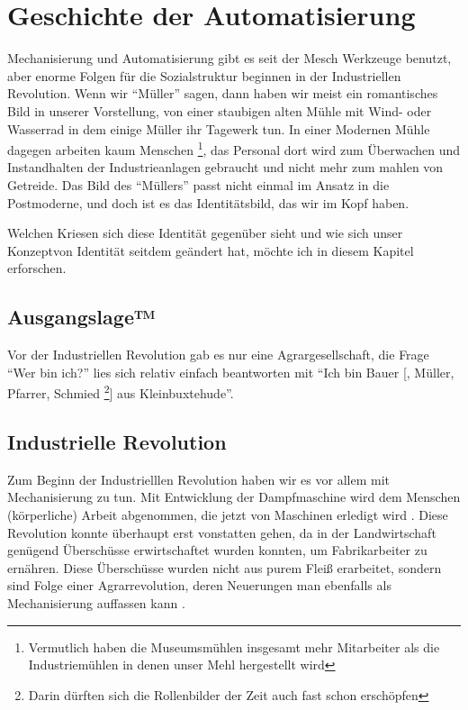\section{Geschichte der Automatisierung}

Mechanisierung und Automatisierung gibt es seit der Mesch Werkzeuge benutzt, aber enorme Folgen für die Sozialstruktur beginnen in der Industriellen Revolution.
Wenn wir \enquote{Müller} sagen, dann haben wir meist ein romantisches Bild in unserer Vorstellung, von einer staubigen alten Mühle mit Wind- oder Wasserrad in dem einige Müller ihr Tagewerk tun.
In einer Modernen Mühle dagegen arbeiten kaum Menschen \footnote{Vermutlich haben die Museumsmühlen insgesamt mehr Mitarbeiter als die Industriemühlen in denen unser Mehl hergestellt wird}, das Personal dort wird zum Überwachen und Instandhalten der Industrieanlagen gebraucht und nicht mehr zum mahlen von Getreide.
Das Bild des \enquote{Müllers} passt nicht einmal im Ansatz in die Postmoderne, und doch ist es das Identitätsbild, das wir im Kopf haben.

Welchen Kriesen sich diese Identität gegenüber sieht und wie sich unser Konzeptvon Identität seitdem geändert hat, möchte ich in diesem Kapitel erforschen.


\subsection{Ausgangslage™}

Vor der Industriellen Revolution gab es nur eine Agrargesellschaft, die Frage \enquote{Wer bin ich?} lies sich relativ einfach beantworten mit \enquote{Ich bin Bauer [, Müller, Pfarrer, Schmied \footnote{Darin dürften sich die Rollenbilder der Zeit auch fast schon erschöpfen}] aus Kleinbuxtehude}.


\subsection{Industrielle Revolution}

Zum Beginn der Industrielllen Revolution haben wir es vor allem mit Mechanisierung zu tun.
Mit Entwicklung der Dampfmaschine wird dem Menschen (körperliche) Arbeit abgenommen, die jetzt von Maschinen erledigt wird \parencite{landes}.
Diese Revolution konnte überhaupt erst vonstatten gehen, da in der Landwirtschaft genügend Überschüsse erwirtschaftet wurden konnten, um Fabrikarbeiter zu ernähren. Diese Überschüsse wurden nicht aus purem Fleiß erarbeitet, sondern sind Folge einer Agrarrevolution, deren Neuerungen man ebenfalls als Mechanisierung auffassen kann \parencite{weissenborn, prass}.

